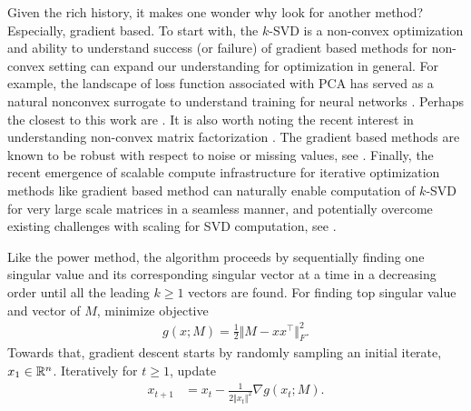 \medskip
{} 
%
Given the rich history, it makes one wonder why look for another method? Especially, gradient based. 
To start with, the $k$-SVD is a non-convex optimization and ability to understand success (or failure) of gradient based methods for non-convex setting 
can expand our understanding for optimization in general. For example, the landscape of loss function associated with PCA has served as a 
natural nonconvex surrogate to understand training for neural networks \cite{baldi1989neural} \cite{chi2019nonconvex}\cite{ge2015escaping, ge2016matrix, ge2017no, stoger2021small}. Perhaps the closest to this work are \cite{de2015global, jain2017global, stoger2021small, zhang2023preconditioned, jia2024preconditioning, li2024crucial}. It is also worth noting the recent interest in understanding non-convex matrix factorization \cite{ge2015escaping, ge2016matrix, ge2017no, stoger2021small, de2015global, jain2017global, stoger2021small, zhang2023preconditioned, jia2024preconditioning, li2024crucial}.
%
The gradient based methods are known to be robust with respect to noise or missing values, see  \cite{hazan2016introduction}. 
%
Finally, the recent emergence of scalable compute infrastructure for iterative optimization methods like gradient based method can naturally 
enable computation of $k$-SVD for very large scale matrices in a seamless manner, and potentially overcome  existing challenges with scaling 
for SVD computation, see \cite{struski2024efficient}. 

\medskip
{} Like the power method, the algorithm proceeds by sequentially finding one singular value and its corresponding  
singular vector at a time in a decreasing order until all the leading $k \geq 1$ vectors are found. For finding top singular value and vector of $M$, 
minimize objective 
\begin{align}\label{eq:objective}
    g(x; M) = \frac{1}{2} \Vert M - xx^\top \Vert_F^2.
\end{align}
Towards that, gradient descent starts by randomly sampling an initial iterate, $x_1 \in \mathbb{R}^{n}$. Iteratively for $t \geq 1$, update 
\begin{align}\label{eq:gradient}
x_{t+1} & = x_{t} - \frac{1}{2 \Vert x_t \Vert^2} \nabla g (x_t; M). 
\end{align}

